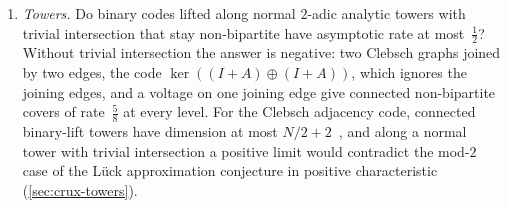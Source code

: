 \begin{enumerate}[label=\arabic*.,leftmargin=2em]
\item \emph{Towers.} Do binary codes lifted along normal $2$-adic analytic towers with trivial intersection that stay
non-bipartite have asymptotic rate at most~$\frac12$? Without trivial intersection the answer is negative: two Clebsch graphs
joined by two edges, the code $\ker((I+A)\oplus(I+A))$, which ignores the joining edges, and a voltage on one joining edge
give connected non-bipartite covers of rate~$\frac58$ at every level. For the Clebsch adjacency code, connected binary-lift
towers have dimension at most $N/2+2$~\cite[Theorem~9.2]{Covers2026}, and along a normal tower with trivial intersection a
positive limit would contradict the mod-$2$ case of the Lück approximation conjecture in positive
characteristic~\cite[Section~8]{JaikinSouza2026} (\cref{sec:crux-towers}).
\end{enumerate}
